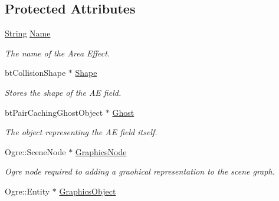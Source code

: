\subsection*{Protected Attributes}
\begin{DoxyCompactItemize}
\item 
\hypertarget{classphys_1_1AreaEffect_a1cf5a878eb22b30a166f5b065944a986}{
\hyperlink{namespacephys_aa03900411993de7fbfec4789bc1d392e}{String} \hyperlink{classphys_1_1AreaEffect_a1cf5a878eb22b30a166f5b065944a986}{Name}}
\label{d4/d55/classphys_1_1AreaEffect_a1cf5a878eb22b30a166f5b065944a986}

\begin{DoxyCompactList}\small\item\em The name of the Area Effect. \item\end{DoxyCompactList}\item 
\hypertarget{classphys_1_1AreaEffect_af8189f9e8dc4bf04f44550918e0ee117}{
btCollisionShape $\ast$ \hyperlink{classphys_1_1AreaEffect_af8189f9e8dc4bf04f44550918e0ee117}{Shape}}
\label{d4/d55/classphys_1_1AreaEffect_af8189f9e8dc4bf04f44550918e0ee117}

\begin{DoxyCompactList}\small\item\em Stores the shape of the AE field. \item\end{DoxyCompactList}\item 
\hypertarget{classphys_1_1AreaEffect_ae730c591bf929404f337d71d4119bde8}{
btPairCachingGhostObject $\ast$ \hyperlink{classphys_1_1AreaEffect_ae730c591bf929404f337d71d4119bde8}{Ghost}}
\label{d4/d55/classphys_1_1AreaEffect_ae730c591bf929404f337d71d4119bde8}

\begin{DoxyCompactList}\small\item\em The object representing the AE field itself. \item\end{DoxyCompactList}\item 
\hypertarget{classphys_1_1AreaEffect_a7fbb785d7357cc7eac68dc94bb72c18a}{
Ogre::SceneNode $\ast$ \hyperlink{classphys_1_1AreaEffect_a7fbb785d7357cc7eac68dc94bb72c18a}{GraphicsNode}}
\label{d4/d55/classphys_1_1AreaEffect_a7fbb785d7357cc7eac68dc94bb72c18a}

\begin{DoxyCompactList}\small\item\em Ogre node required to adding a graohical representation to the scene graph. \item\end{DoxyCompactList}\item 
\hypertarget{classphys_1_1AreaEffect_a31b755c85d318438e42e300de56d2e5c}{
Ogre::Entity $\ast$ \hyperlink{classphys_1_1AreaEffect_a31b755c85d318438e42e300de56d2e5c}{GraphicsObject}}
\label{d4/d55/classphys_1_1AreaEffect_a31b755c85d318438e42e300de56d2e5c}


\end{DoxyCompactItemize}
